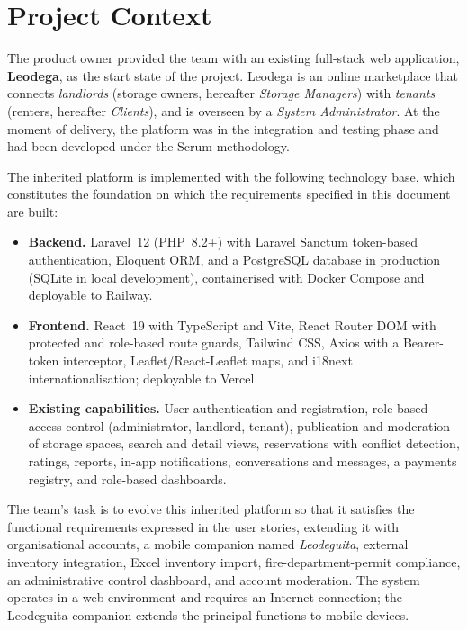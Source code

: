 \documentclass[11pt,a4paper,oneside]{report}
\begin{document}
\section{Project Context}

The product owner provided the team with an existing full-stack web application, \textbf{Leodega}, as the start state of the project. Leodega is an online marketplace that connects \emph{landlords} (storage owners, hereafter \emph{Storage Managers}) with \emph{tenants} (renters, hereafter \emph{Clients}), and is overseen by a \emph{System Administrator}. At the moment of delivery, the platform was in the integration and testing phase and had been developed under the Scrum methodology.

The inherited platform is implemented with the following technology base, which constitutes the foundation on which the requirements specified in this document are built:

\begin{itemize}
    \item \textbf{Backend.} Laravel~12 (PHP~8.2+) with Laravel Sanctum token-based authentication, Eloquent ORM, and a PostgreSQL database in production (SQLite in local development), containerised with Docker Compose and deployable to Railway.
    \item \textbf{Frontend.} React~19 with TypeScript and Vite, React Router DOM with protected and role-based route guards, Tailwind CSS, Axios with a Bearer-token interceptor, Leaflet/React-Leaflet maps, and i18next internationalisation; deployable to Vercel.
    \item \textbf{Existing capabilities.} User authentication and registration, role-based access control (administrator, landlord, tenant), publication and moderation of storage spaces, search and detail views, reservations with conflict detection, ratings, reports, in-app notifications, conversations and messages, a payments registry, and role-based dashboards.
\end{itemize}

The team's task is to evolve this inherited platform so that it satisfies the functional requirements expressed in the user stories, extending it with organisational accounts, a mobile companion named \emph{Leodeguita}, external inventory integration, Excel inventory import, fire-department-permit compliance, an administrative control dashboard, and account moderation. The system operates in a web environment and requires an Internet connection; the Leodeguita companion extends the principal functions to mobile devices.
\end{document}
